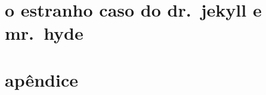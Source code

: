 \documentclass[10pt]{hedrabook}
\begin{document}
\ifodd\thepage\paginabranca\fi

\endgroup
\setcounter{tocdepth}{0}     %
\setcounter{secnumdepth}{-2} %

\hedratoc

\fontsize{10.5pt}{\baselineskip}\selectfont
\baselineskip=12.6pt   %



\part{o estranho caso do dr.~jekyll e mr.~hyde}


\makeatletter
\renewcommand{\@endpart}{\vfil\clearpage}
\makeatother

\part{apêndice}




\ifdefined\printcheck\printcheck\fi
\end{document}
